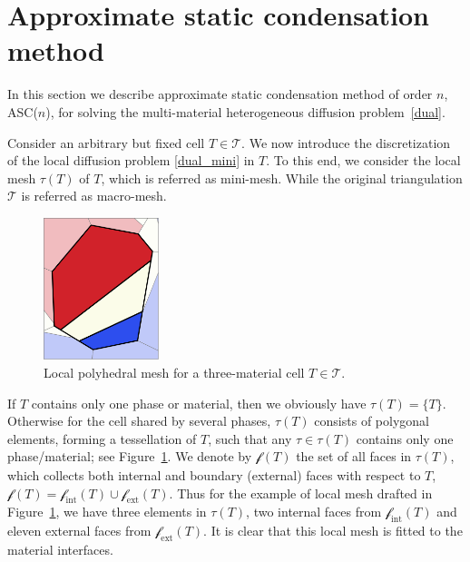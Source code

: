 \documentclass[12pt]{article}
\newcommand{\vect}[1]{\boldsymbol{\mathbf{#1}}}
\newcommand{\bcell}{T}
\newcommand{\bmesh}{{\vect{\mathcal T}}}
\newcommand{\mmesh}{{\vect{\mathcal \tau}}}
\newcommand{\mfaces}[1][]{{\vect{\mathcal f}_{\text{#1}}}}
\begin{document}
\section{Approximate static condensation method} \label{sec:ASC}
	
In this section we describe  approximate static condensation method of order $n$, ASC($n$), for solving the multi-material heterogeneous diffusion problem~\eqref{dual}.
	
Consider an arbitrary but fixed cell $T\in\bmesh$. We now introduce the discretization of the local diffusion problem \eqref{dual_mini} in $T$. To this end, we consider the local mesh $\mmesh(T)$ of $T$, which is referred as mini-mesh. While the original triangulation $\bmesh$ is referred as macro-mesh.
\begin{figure}
\vspace{-10pt}
  \begin{center}
    \includegraphics[width=0.3\textwidth]{./ring_mini_voronoi_cell.png}%
    \caption{Local polyhedral mesh for a three-material cell $T\in\bmesh$.\label{fig:mmesh}}
  \end{center}
  \vspace{-15pt}
  \vspace{1pt}
\end{figure}
If $T$ contains only one phase or material, then we obviously have $\mmesh(T) = \{\bcell\}$. Otherwise for the cell shared by several phases, $\mmesh(T)$ consists of polygonal elements, forming a tessellation of $T$, such that any ${\tau \in \mmesh(T)}$ contains only one phase/material; see Figure~\ref{fig:mmesh}. We denote by $\mfaces(T)$ the set of all faces in $\mmesh(T)$, which collects both   internal and boundary (external) faces with respect to $T$,  $\mfaces(T) = \mfaces[int](T) \cup \mfaces[ext](T)$. Thus for the example of local mesh drafted in Figure~\ref{fig:mmesh}, we have three elements in $\mmesh(T)$, two internal faces from $\mfaces[int](T)$ and eleven external faces from $\mfaces[ext](T)$. It is clear that this local mesh is fitted to the material interfaces.
\end{document}
